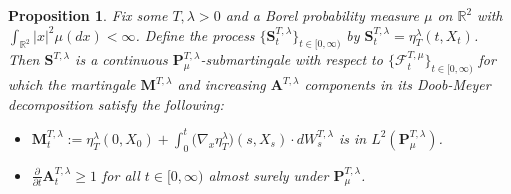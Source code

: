 \documentclass[10pt]{article}
\numberwithin{equation}{section}
\newtheorem{proposition}[theorem]{Proposition}
\theoremstyle{definition}
\newcommand{\R}{{\mathbb R}}
\begin{document}
\begin{proposition}\label{PropSquaredBessel} Fix some $T,\lambda > 0 $  and  a Borel probability measure $\mu$ on $ \R^2$ with $\int_{\R^2}|x|^2\mu(dx)<\infty$. Define the process $\{\mathbf{S}_{t}^{T,\lambda }\}_{t\in [0,\infty)}$  by $\mathbf{S}_{t}^{T,\lambda}=\eta_{T}^{\lambda}(t,X_t)$.  Then $\mathbf{S}^{T,\lambda}$ is a continuous $\mathbf{P}_{\mu}^{T,\lambda}$-submartingale with respect to $\{\mathscr{F}_{t}^{T,\mu}\}_{t\in [0,\infty)}$ for which the martingale $\mathbf{M}^{T,\lambda }$ and increasing $\mathbf{A}^{T,\lambda }$ components in its Doob-Meyer decomposition satisfy the following:
\begin{itemize}
    \item $
\mathbf{M}_{t}^{T,\lambda }:=\eta_{T}^{\lambda}(0,X_0)+\int_0^t \big(\nabla_x\eta_{T}^{\lambda}\big)(s, X_{s}) \cdot dW_{s}^{T,\lambda}
$ is in $L^2(\mathbf{P}_{\mu}^{T,\lambda})  $.

    \item $
\frac{\partial}{\partial t}\mathbf{A}^{T,\lambda }_t \geq  1
$
for all $t\in [0,\infty)$ almost surely under $\mathbf{P}_{\mu}^{T,\lambda}$. 
\end{itemize}



\end{proposition}
\end{document}
